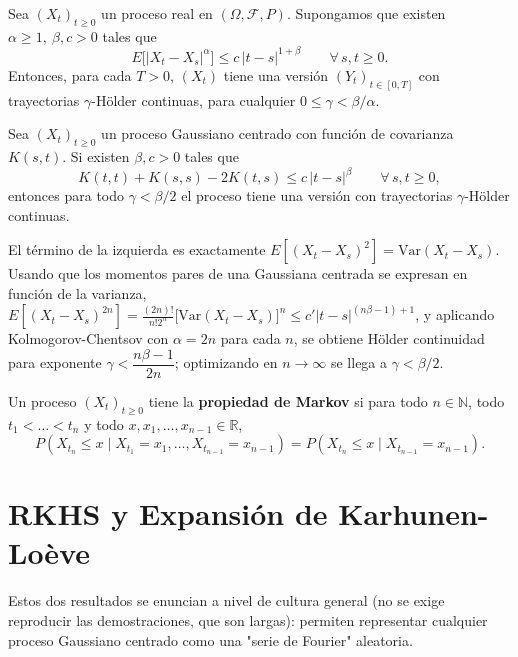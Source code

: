 \begin{teo}
Sea $(X_t)_{t\ge0}$ un proceso real en $(\Omega,\mathcal{F},P)$. Supongamos que existen $\alpha\ge1,\ \beta,c>0$ tales que
\[
E\big[|X_t-X_s|^\alpha\big] \le c\,|t-s|^{1+\beta} \qquad \forall\, s,t\ge0.
\]
Entonces, para cada $T>0$, $(X_t)$ tiene una versión $(Y_t)_{t\in[0,T]}$ con trayectorias $\gamma$-Hölder continuas, para cualquier $0\le \gamma < \beta/\alpha$.
\end{teo}

\begin{teo}
Sea $(X_t)_{t\ge0}$ un proceso Gaussiano centrado con función de covarianza $K(s,t)$. Si existen $\beta,c>0$ tales que
\[
K(t,t)+K(s,s)-2K(t,s) \le c\,|t-s|^\beta \qquad \forall\, s,t\ge0,
\]
entonces para todo $\gamma<\beta/2$ el proceso tiene una versión con trayectorias $\gamma$-Hölder continuas.
\end{teo}
\begin{observacion}
El término de la izquierda es exactamente $E[(X_t-X_s)^2]=\text{Var}(X_t-X_s)$. Usando que los momentos pares de una Gaussiana centrada se expresan en función de la varianza, $E[(X_t-X_s)^{2n}] = \frac{(2n)!}{n!2^n}\big[\text{Var}(X_t-X_s)\big]^n \le c'|t-s|^{(n\beta-1)+1}$, y aplicando Kolmogorov-Chentsov con $\alpha=2n$ para cada $n$, se obtiene Hölder continuidad para exponente $\gamma<\dfrac{n\beta-1}{2n}$; optimizando en $n\to\infty$ se llega a $\gamma<\beta/2$.
\end{observacion}

\begin{definicion}
Un proceso $(X_t)_{t\ge0}$ tiene la \textbf{propiedad de Markov} si para todo $n\in\mathbb{N}$, todo $t_1<\dots<t_n$ y todo $x,x_1,\dots,x_{n-1}\in\mathbb{R}$,
\[
P(X_{t_n}\le x \mid X_{t_1}=x_1,\dots,X_{t_{n-1}}=x_{n-1}) = P(X_{t_n}\le x \mid X_{t_{n-1}}=x_{n-1}).
\]
\end{definicion}

\section{RKHS y Expansión de Karhunen-Loève}

\noindent
Estos dos resultados se enuncian a nivel de cultura general (no se exige reproducir las demostraciones, que son largas): permiten representar cualquier proceso Gaussiano centrado como una "serie de Fourier" aleatoria.

